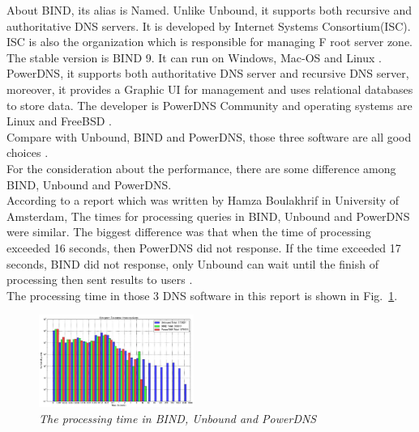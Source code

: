 \documentclass[conference]{IEEEtran}
\begin{document}
About BIND, its alias is Named. Unlike Unbound, it supports both recursive and authoritative DNS servers. It is developed by Internet Systems Consortium(ISC). ISC is also the organization which is responsible for managing F root server zone. The stable version is BIND 9. It can run on Windows, Mac-OS and Linux \cite{BIND_wiki}.
\\

PowerDNS, it supports both authoritative DNS server and recursive DNS server, moreover, it provides a Graphic UI for management and uses relational databases to store data. The developer is PowerDNS Community and operating systems are Linux and FreeBSD  \cite{PowerDNS_wiki}.
\\

Compare with Unbound, BIND and PowerDNS, those three software are all good choices \cite{Compare_the_different_DNS_servers}.
\\

For the consideration about the performance, there are some difference among BIND, Unbound and PowerDNS.
\\

According to a report which was written by Hamza Boulakhrif in University of Amsterdam, The times for processing queries in BIND, Unbound and PowerDNS were similar. The biggest difference was that when the time of processing exceeded 16 seconds, then PowerDNS did not response. If the time exceeded 17 seconds, BIND did not response, only Unbound can wait until the finish of processing then sent results to users \cite{DNS_resolver_performance_measurements}.
\\

The processing time in those 3 DNS software in this report is shown in Fig.~\ref{fig:DNS_resolver_performance_measurements}.
\\

\begin{figure}[hbt!]  
    \centering
    \includegraphics[width=0.45\textwidth]{figure/DNS-resolver-measurement.jpg}
    \caption{\em The processing time in BIND, Unbound and PowerDNS \cite{DNS_resolver_performance_measurements} \label{fig:DNS_resolver_performance_measurements}}
\end{figure}
\end{document}

